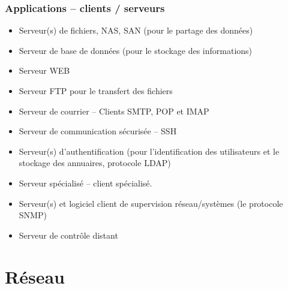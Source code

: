 	\begin{frame}[containsverbatim]
		\frametitle{Applications – clients / serveurs }
		\begin{itemize}
			\item  Serveur(s) de fichiers, NAS, SAN (pour le partage des données)
			\item Serveur de base de données (pour le stockage des informations)
			\item Serveur WEB
			\item Serveur FTP pour le transfert des fichiers
			
			\item Serveur de courrier – Clients SMTP, POP et IMAP
			\item Serveur de communication sécurisée – SSH
			\item Serveur(s) d'authentification (pour l'identification des utilisateurs et le
			stockage des annuaires, protocole LDAP)
			\item Serveur spécialisé – client spécialisé.
			\item Serveur(s) et logiciel client de supervision réseau/systèmes (le protocole SNMP)
			\item Serveur de contrôle distant 
		\end{itemize}
		
		
	\end{frame}
	\section{Réseau}
	
